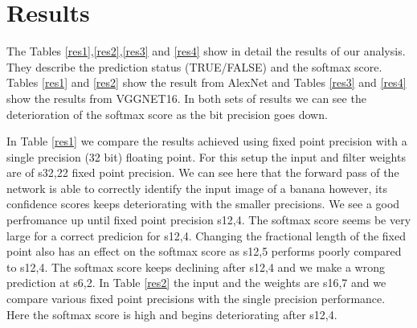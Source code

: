 \documentclass[conference]{IEEEtran}
\begin{document}
\section{Results}
The Tables \ref{res1},\ref{res2},\ref{res3} and \ref{res4} show in detail the results of our analysis. They describe the prediction status (TRUE/FALSE) and the softmax score. Tables \ref{res1} and \ref{res2} show the result from AlexNet and Tables \ref{res3} and \ref{res4} show the results from VGGNET16. In both sets of results we can see the deterioration of the softmax score as the bit precision goes down. 



In Table \ref{res1} we compare the results achieved using fixed point precision with a single precision (32 bit) floating point. For this setup the input and filter weights are of s32,22 fixed point precision. We can see here that the forward pass of the network is able to correctly identify the input image of a banana however, its confidence scores keeps deteriorating with the smaller precisions. We see a good perfromance up until fixed point precision s12,4. The softmax score seems be very large for a correct predicion for s12,4. Changing the fractional length of the fixed point also has an effect on the softmax score as s12,5 performs poorly compared to s12,4. The softmax score keeps declining after s12,4 and we make a wrong prediction at s6,2.  
In Table \ref{res2} the input and the weights are s16,7 and we compare various fixed point precisions with the single precision performance. Here the softmax score is high and begins deteriorating after s12,4.
\end{document}
